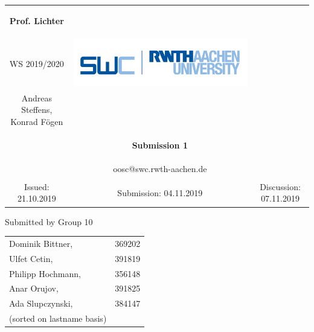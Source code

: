 \documentclass[a4paper,12pt,oneside]{scrreprt}
\begin{document}
	
\begin{tabular}{ccc}
	\begin{large} \textbf{Prof. Lichter} \end{large} &
	
	\begin{minipage}[H]{3.5cm}
	\centering
		\begin{large} OOSC \end{large} \\
		\begin{large} WS 2019/2020 \end{large}
	\end{minipage} &
	
	\begin{minipage}[H]{4cm}
		\includegraphics[keepaspectratio,width=\textwidth,angle=0]{images/swc.png}
	\end{minipage} \\
Andreas Steffens, Konrad F\"ogen &  &  \\
& \begin{huge} \textbf{Submission 1} \end{huge}&  \\
& oosc@swc.rwth-aachen.de &  \\
& & \\
Issued: 21.10.2019 &
Submission: 04.11.2019 &
Discussion: 07.11.2019 \\
\end{tabular}
\newline \newline \newline
\centering
Submitted by Group 10

\begin{tabular}{ll}
	Dominik Bittner, & 369202 \\
	Ulfet Cetin, & 391819\\
 	Philipp Hochmann, & 356148 \\
 	Anar Orujov, & 391825\\
 	Ada Slupczynski, & 384147\\
 	(sorted on lastname basis)
\end{tabular}
\end{document}
